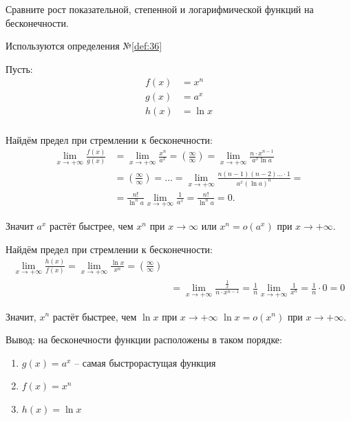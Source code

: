 \begin{question}
    Сравните рост показательной, степенной и логарифмической функций на бесконечности.
\end{question}
\begin{used}
    Используются определения №\ref{def:36}
\end{used}
\begin{answer}
    Пусть:
    \begin{align*}
        f(x) &= x^n \\
        g(x) &= a^x \\
        h(x) &= \ln x \\
    \end{align*}

    Найдём предел при стремлении к бесконечности:
    \begin{align*}
        \lim_{x \to +\infty} \frac{f(x)}{g(x)} &= \lim_{x \to +\infty} \frac{x^n}{a^x} = \left( \frac{\infty}{\infty} \right) = \lim_{x \to +\infty} \frac{n \cdot x ^ {n-1}}{a^x \ln a} \\
            &= \left( \frac{\infty}{\infty} \right) = \ldots = \lim_{x \to +\infty} \frac{n(n-1)(n-2)\ldots \cdot 1}{a^x(\ln a)^n} = \\
            &= \frac{n!}{\ln^n a} \lim_{x \to +\infty} \frac{1}{a^x} = \frac{n!}{\ln^n a} = 0.
    \end{align*}

    Значит $a^x$ растёт быстрее, чем  $x^n$ при $x \to \infty$ или $x^n = o(a^x)$ при $x \to +\infty$.

    Найдём предел при стремлении к бесконечности:
    \begin{align*}
        \lim_{x \to +\infty} \frac{h(x)}{f(x)} = \lim_{x \to +\infty} \frac{\ln x}{x^n} = \left( \frac{\infty}{\infty} \right) \\
            &= \lim_{x \to +\infty}  \frac{\frac{1}{x}}{n \cdot x^{n-1}} = \frac{1}{n} \lim_{x \to +\infty} \frac{1}{x^n} = \frac{1}{n} \cdot 0 = 0
    \end{align*}

    Значит, $x^n$ растёт быстрее, чем  $\ln x$ при $x\to +\infty$ $\ln x = o(x^n)$ при $x \to  +\infty$.

    Вывод: на бесконечности функции расположены в таком порядке:
    \begin{enumerate}
        \item $g(x) = a^x$ -- самая быстрорастущая функция \\
        \item $f(x) = x^n$ \\
        \item $h(x) = \ln x$
    \end{enumerate}
\end{answer}
\pagebreak



